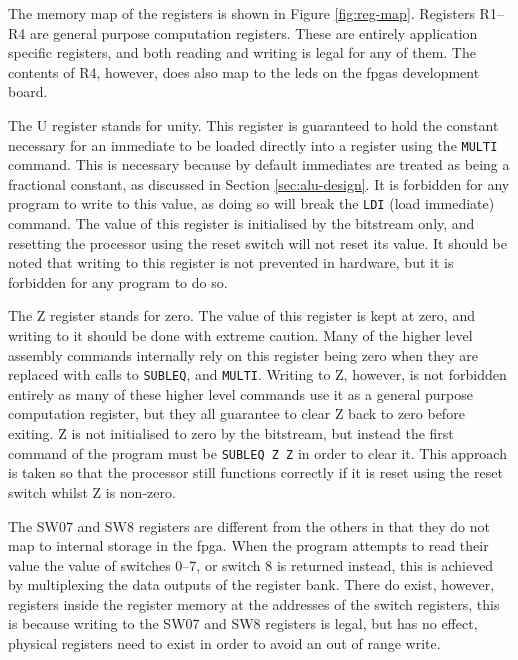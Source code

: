 The memory map of the registers is shown in Figure \ref{fig:reg-map}. Registers R1--R4 are general purpose computation registers. These are entirely application specific registers, and both reading and writing is legal for any of them. The contents of R4, however, does also map to the \glspl{led} on the \glspl{fpga} development board.

The U register stands for unity. This register is guaranteed to hold the constant necessary for an immediate to be loaded directly into a register using the \texttt{MULTI} command. This is necessary because by default immediates are treated as being a fractional constant, as discussed in Section \ref{sec:alu-design}. It is forbidden for any program to write to this value, as doing so will break the \texttt{LDI} (load immediate) command. The value of this register is initialised by the bitstream only, and resetting the processor using the reset switch will not reset its value. It should be noted that writing to this register is not prevented in hardware, but it is forbidden for any program to do so.

The Z register stands for zero. The value of this register is kept at zero, and writing to it should be done with extreme caution. Many of the higher level assembly commands internally rely on this register being zero when they are replaced with calls to \texttt{SUBLEQ}, and \texttt{MULTI}. Writing to Z, however, is not forbidden entirely as many of these higher level commands use it as a general purpose computation register, but they all guarantee to clear Z back to zero before exiting. Z is not initialised to zero by the bitstream, but instead the first command of the program must be \texttt{SUBLEQ Z Z} in order to clear it. This approach is taken so that the processor still functions correctly if it is reset using the reset switch whilst Z is non-zero.

The SW07 and SW8 registers are different from the others in that they do not map to internal storage in the \gls{fpga}. When the program attempts to read their value the value of switches 0--7, or switch 8 is returned instead, this is achieved by multiplexing the data outputs of the register bank. There do exist, however, registers inside the register memory at the addresses of the switch registers, this is because writing to the SW07 and SW8 registers is legal, but has no effect, physical registers need to exist in order to avoid an out of range write.



